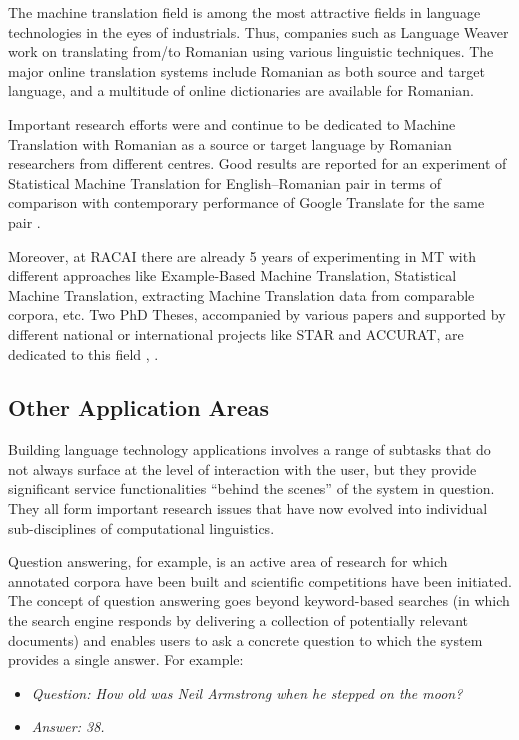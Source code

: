 \begin{multicols}{2}
The machine translation field is among the most attractive fields in language technologies in the eyes of industrials. Thus, companies such as Language Weaver work on translating from/to Romanian using various linguistic techniques. The major online translation systems include Romanian as both source and target language, and a multitude of online dictionaries are available for Romanian.

Important research efforts were and continue to be dedicated to Machine Translation with Romanian as a source or target language by Romanian researchers from different centres. Good results are reported for an experiment of Statistical Machine Translation for English--Romanian pair in terms of comparison with contemporary performance of Google Translate for the same pair \cite{munteanu}. 

Moreover, at RACAI there are already 5 years of experimenting in MT with different approaches like Example-Based Machine Translation, Statistical Machine Translation, extracting Machine Translation data from comparable corpora, etc. Two PhD Theses, accompanied by various papers and supported by different national or international projects like STAR and ACCURAT, are dedicated to this field \cite{tufisMT}, \cite{irimia}.
 
\subsection{Other Application Areas}

Building language technology applications involves a range of subtasks that do not always surface at the level of interaction with the user, but they provide significant service functionalities “behind the scenes” of the system in question. They all form important research issues that have now evolved into individual sub-disciplines of computational linguistics.  

Question answering, for example, is an active area of research for which annotated corpora have been built and scientific competitions have been initiated. The concept of question answering goes beyond keyword-based searches (in which the search engine responds by delivering a collection of potentially relevant documents) and enables users to ask a concrete question to which the system provides a single answer. For example:

\begin{itemize}
\item[] \textit{Question: How old was Neil Armstrong when he stepped on the moon?}
\item[] \textit{Answer: 38.}
\end{itemize}


\end{multicols}
